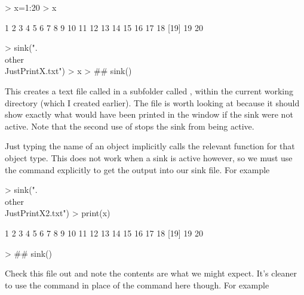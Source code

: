 
\begin{Schunk}
\begin{Sinput}
> x=1:20 
> x 
\end{Sinput}
\begin{Soutput}
 [1]  1  2  3  4  5  6  7  8  9 10 11 12 13 14 15 16 17 18
[19] 19 20
\end{Soutput}
\end{Schunk}

\begin{Schunk}
\begin{Sinput}
> sink(".\\other\\JustPrintX.txt")
> x
> ## sink()
\end{Sinput}
\end{Schunk}

 
This creates a text file called  in a subfolder called , within the current working directory (which I created earlier). The file is worth looking at because it should show exactly what would have been printed in the \R{} window if the sink were not active. Note that the second use of  stops the sink from being active. 
 
Just typing the name of an object implicitly calls the relevant  function for that object type. This does not work when a sink is active however, so we must use the  command explicitly to get the output into our sink file. For example 

\begin{Schunk}
\begin{Sinput}
> sink(".\\other\\JustPrintX2.txt")
> print(x)
\end{Sinput}
\begin{Soutput}
 [1]  1  2  3  4  5  6  7  8  9 10 11 12 13 14 15 16 17 18
[19] 19 20
\end{Soutput}
\begin{Sinput}
> ## sink()
\end{Sinput}
\end{Schunk}

Check this file out and note the contents are what we might expect. It's cleaner to use the  command in place of the  command here though. For example 

